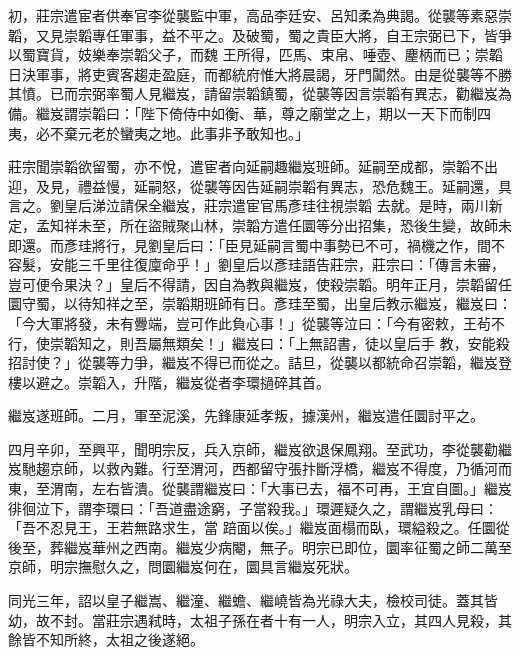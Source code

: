 \begin{pinyinscope}
 初，莊宗遣宦者供奉官李從襲監中軍，高品李廷安、呂知柔為典謁。從襲等素惡崇韜，又見崇韜專任軍事，益不平之。及破蜀，蜀之貴臣大將，自王宗弼已下，皆爭以蜀寶貨，妓樂奉崇韜父子，而魏
 王所得，匹馬、束帛、唾壺、麈柄而已；崇韜日決軍事，將吏賓客趨走盈庭，而都統府惟大將晨謁，牙門闐然。由是從襲等不勝其憤。已而宗弼率蜀人見繼岌，請留崇韜鎮蜀，從襲等因言崇韜有異志，勸繼岌為備。繼岌謂崇韜曰：「陛下倚侍中如衡、華，尊之廟堂之上，期以一天下而制四夷，必不棄元老於蠻夷之地。此事非予敢知也。」



 莊宗聞崇韜欲留蜀，亦不悅，遣宦者向延嗣趣繼岌班師。延嗣至成都，崇韜不出迎，及見，禮益慢，延嗣怒，從襲等因告延嗣崇韜有異志，恐危魏王。延嗣還，具言之。劉皇后涕泣請保全繼岌，莊宗遣宦官馬彥珪往視崇韜
 去就。是時，兩川新定，孟知祥未至，所在盜賊聚山林，崇韜方遣任圜等分出招集，恐後生變，故師未即還。而彥珪將行，見劉皇后曰：「臣見延嗣言蜀中事勢已不可，禍機之作，間不容髮，安能三千里往復廩命乎！」劉皇后以彥珪語告莊宗，莊宗曰：「傳言未審，豈可便令果決？」皇后不得請，因自為教與繼岌，使殺崇韜。明年正月，崇韜留任圜守蜀，以待知祥之至，崇韜期班師有日。彥珪至蜀，出皇后教示繼岌，繼岌曰：「今大軍將發，未有釁端，豈可作此負心事！」從襲等泣曰：「今有密敕，王茍不行，使崇韜知之，則吾屬無類矣！」繼岌曰：「上無詔書，徒以皇后手
 教，安能殺招討使？」從襲等力爭，繼岌不得已而從之。詰旦，從襲以都統命召崇韜，繼岌登樓以避之。崇韜入，升階，繼岌從者李環撾碎其首。



 繼岌遂班師。二月，軍至泥溪，先鋒康延孝叛，據漢州，繼岌遣任圜討平之。



 四月辛卯，至興平，聞明宗反，兵入京師，繼岌欲退保鳳翔。至武功，李從襲勸繼岌馳趨京師，以救內難。行至渭河，西都留守張抃斷浮橋，繼岌不得度，乃循河而東，至渭南，左右皆潰。從襲謂繼岌曰：「大事已去，福不可再，王宜自圖。」繼岌徘徊泣下，謂李環曰：「吾道盡途窮，子當殺我。」環遲疑久之，謂繼岌乳母曰：「吾不忍見王，王若無路求生，當
 踣面以俟。」繼岌面榻而臥，環縊殺之。任圜從後至，葬繼岌華州之西南。繼岌少病閹，無子。明宗已即位，圜率征蜀之師二萬至京師，明宗撫慰久之，問圜繼岌何在，圜具言繼岌死狀。



 同光三年，詔以皇子繼嵩、繼潼、繼蟾、繼嶢皆為光祿大夫，檢校司徒。蓋其皆幼，故不封。當莊宗遇弒時，太祖子孫在者十有一人，明宗入立，其四人見殺，其餘皆不知所終，太祖之後遂絕。



\end{pinyinscope}